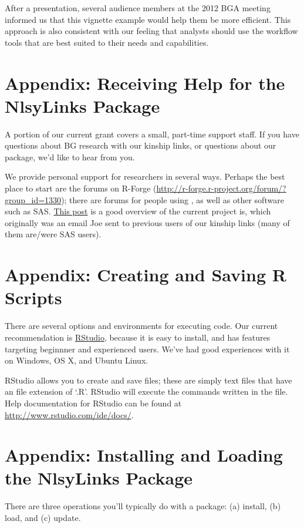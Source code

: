 \documentclass{article}\usepackage[]{graphicx}\usepackage[]{color}
\begin{document}
After a presentation, several audience members at the 2012 BGA meeting informed us that this vignette example would help them be more efficient.  This approach is also consistent with our feeling that analysts should use the workflow tools that are best suited to their needs and capabilities.

\appendix
\section{Appendix: Receiving Help for the NlsyLinks Package}
\label{sec:ReceivingHelp} A portion of our current grant covers a small, part-time support
staff.  If you have questions about BG research with our kinship links, or
questions about our package, we'd like to hear from you.

We provide personal support for researchers in several ways.  Perhaps the best
place to start are the forums on R-Forge
(\url{http://r-forge.r-project.org/forum/?group_id=1330}); there are forums for
people using \R{}, as well as other software such as SAS.  \href{https://r-forge.r-project.org/forum/forum.php?thread_id=4537&forum_id=4266&group_id=1330}{This
post} is a good overview of the current project is, which originally was an
email Joe sent to previous users of our kinship links (many of them are/were SAS
users).

\section{Appendix: Creating and Saving R Scripts}
\label{sec:RScripts} There are several options and environments for executing \R{} code.  Our current
recommendation is \href{http://rstudio.org/}{RStudio}, because it is easy to
install, and has features targeting beginnner and experienced \R{} users. 
We've had good experiences with it on Windows, OS X, and Ubuntu Linux.

RStudio allows you to create and save \R{} files; these are simply text files
that have an file extension of `.R'.  RStudio will execute the commands written
in the file.  Help documentation for RStudio can be found at
\url{http://www.rstudio.com/ide/docs/}.

\section{Appendix: Installing and Loading the NlsyLinks Package} \label{sec:InstallingPackage}
There are three operations you'll typically do with a package: (a) install, (b) load, and (c) update.
\end{document}
